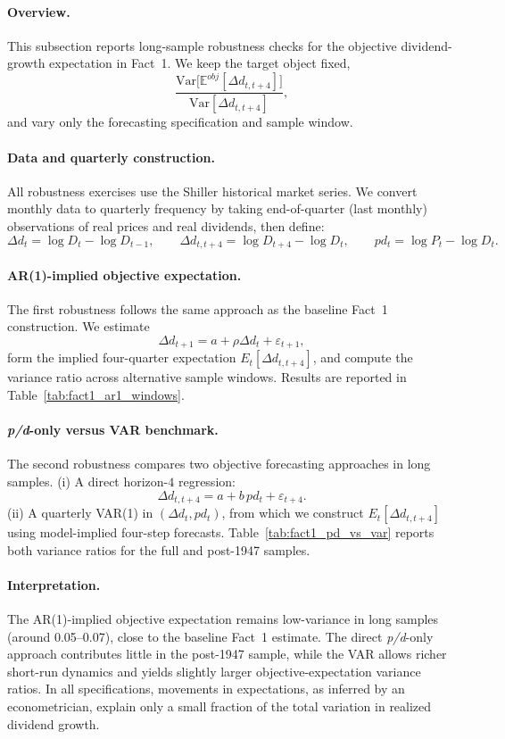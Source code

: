 \paragraph{Overview.}
This subsection reports long-sample robustness checks for the objective dividend-growth expectation in Fact~1. We keep the target object fixed,
\[
\frac{\mathrm{Var}\!\bigl[\mathbb{E}^{obj}[\Delta d_{t,t+4}]\bigr]}{\mathrm{Var}[\Delta d_{t,t+4}]},
\]
and vary only the forecasting specification and sample window.

\paragraph{Data and quarterly construction.}
All robustness exercises use the Shiller historical market series. We convert monthly data to quarterly frequency by taking end-of-quarter (last monthly) observations of real prices and real dividends, then define:
\[
\Delta d_t = \log D_t - \log D_{t-1},\qquad
\Delta d_{t,t+4} = \log D_{t+4} - \log D_t,\qquad
pd_t = \log P_t - \log D_t.
\]

\paragraph{AR(1)-implied objective expectation.}
The first robustness follows the same approach as the baseline Fact~1 construction. We estimate
\[
\Delta d_{t+1}=a+\rho \Delta d_t+\varepsilon_{t+1},
\]
form the implied four-quarter expectation \(E_t[\Delta d_{t,t+4}]\), and compute the variance ratio across alternative sample windows. Results are reported in Table~\ref{tab:fact1_ar1_windows}.

\paragraph{\textit{p/d}-only versus VAR benchmark.}
The second robustness compares two objective forecasting approaches in long samples.  
(i) A direct horizon-$4$ regression:
\[
\Delta d_{t,t+4}=a+b\,pd_t+\varepsilon_{t+4}.
\]
(ii) A quarterly VAR(1) in \((\Delta d_t,pd_t)\), from which we construct \(E_t[\Delta d_{t,t+4}]\) using model-implied four-step forecasts.  
Table~\ref{tab:fact1_pd_vs_var} reports both variance ratios for the full and post-1947 samples.



\paragraph{Interpretation.}
The AR(1)-implied objective expectation remains low-variance in long samples (around 0.05--0.07), close to the baseline Fact~1 estimate. The direct \textit{p/d}-only approach contributes little in the post-1947 sample, while the VAR allows richer short-run dynamics and yields slightly larger objective-expectation variance ratios.
In all specifications, movements in expectations, as inferred by an econometrician, explain only a small fraction of the total variation in realized dividend growth.

